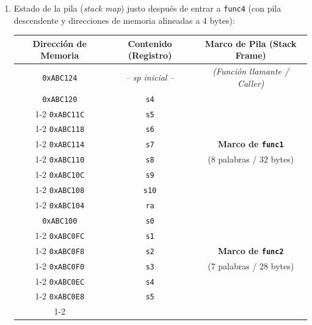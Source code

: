 \documentclass[letterpaper,12pt]{article}
\begin{document}
\begin{enumerate}
\begin{enumerate}[label=\alph*)]
        \item Estado de la pila (\textit{stack map}) justo después de entrar a \texttt{func4} (con pila descendente y direcciones de memoria alineadas a 4 bytes):
        
        \begin{table}[H]
            \centering
            \small
            \begin{tabular}{|c|c|c|}
                \hline
                \textbf{Dirección de Memoria} & \textbf{Contenido (Registro)} & \textbf{Marco de Pila (Stack Frame)} \\
                \hline
                \texttt{0xABC124} & \textit{-- sp inicial --} & \textit{(Función llamante / Caller)} \\
                \hline
                \texttt{0xABC120} & \texttt{s4} & \\
                \cline{1-2}
                \texttt{0xABC11C} & \texttt{s5} & \\
                \cline{1-2}
                \texttt{0xABC118} & \texttt{s6} & \\
                \cline{1-2}
                \texttt{0xABC114} & \texttt{s7} & \textbf{Marco de \texttt{func1}} \\
                \cline{1-2}
                \texttt{0xABC110} & \texttt{s8} & (8 palabras / 32 bytes) \\
                \cline{1-2}
                \texttt{0xABC10C} & \texttt{s9} & \\
                \cline{1-2}
                \texttt{0xABC108} & \texttt{s10} & \\
                \cline{1-2}
                \texttt{0xABC104} & \texttt{ra} & \\
                \hline
                \texttt{0xABC100} & \texttt{s0} & \\
                \cline{1-2}
                \texttt{0xABC0FC} & \texttt{s1} & \\
                \cline{1-2}
                \texttt{0xABC0F8} & \texttt{s2} & \textbf{Marco de \texttt{func2}} \\
                \cline{1-2}
                \texttt{0xABC0F0} & \texttt{s3} & (7 palabras / 28 bytes) \\
                \cline{1-2}
                \texttt{0xABC0EC} & \texttt{s4} & \\
                \cline{1-2}
                \texttt{0xABC0E8} & \texttt{s5} & \\
                \cline{1-2}

\end{tabular}
\end{table}
\end{enumerate}
\end{enumerate}
\end{document}
